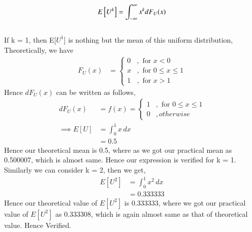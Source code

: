 \documentclass[journal,12pt,twocolumn]{article}
\begin{document}
%
\begin{equation}
E{}\left[U^k\right] = \int_{-\infty}^{\infty}x^kdF_{U}(x)
\end{equation}
\\
\solution
If k = 1, then E[$U^1$] is nothing but the mean of this uniform distribution,\newline
Theoretically, we have 
\begin{align}
	F_U(x) &= \begin{cases} 0 &, \text{ for } x < 0\\
	 x &, \text{ for } 0 \leq x \leq 1 \\
	 1 &, \text{ for } x > 1\end{cases}
\end{align}
Hence $dF_U(x)$ can be written as follows,
\begin{align}
	dF_U(x) &= f(x) = \begin{cases} 1 &,\text{ for } 0 \leq x \leq 1 \\
	0 &, otherwise\end{cases} \\
	\implies E[U] &= \int_{0}^{1} x \,dx \\
	&= 0.5
\end{align}
Hence our theoretical mean is 0.5, where as we got our practical mean as 0.500007, which is almost same.\newline
Hence our expression is verified for k = 1.\newline
Similarly we can consider k = 2, then we get,
\begin{align}
	E[U^2] &= \int_{0}^{1} x^2 \, dx \\
	&= 0.333333 
\end{align}
Hence our theoretical value of $E[U^2]$ is 0.333333, where we got our practical value of $E[U^2]$ as 0.333308, which is again almost same as that of theoretical value.\newline
Hence Verified.
\end{document}
